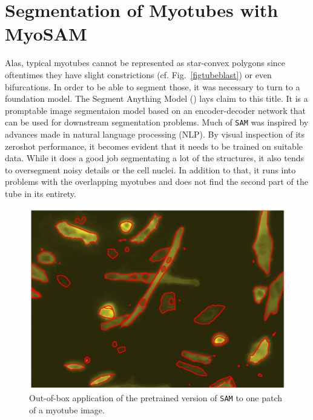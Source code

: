 \section{Segmentation of Myotubes with MyoSAM}
Alas, typical myotubes cannot be represented as star-convex polygons since oftentimes they have slight constrictions (cf. Fig.~\ref{figtubeblast}) or even bifurcations. In order to be able to segment those, it was necessary to turn to a foundation model. The Segment Anything Model \cite{kirillov2023segment} (\sam) lays claim to this title. It is a promptable image segmentaion model based on an encoder-decoder network that can be used for downstream segmentation problems. Much of \texttt{SAM} was inspired by advances made in natural language processing (NLP).
By visual inspection of its zeroshot performance, it becomes evident that it needs to be trained on suitable data. While it does a good job segmentating a lot of the structures, it also tends to oversegment noisy details or the cell nuclei. In addition to that, it runs into problems with the overlapping myotubes and does not find the second part of the tube in its entirety.
\begin{figure}
	\centering
	\includegraphics[width=\textwidth]{"images/sam_zeroshot.png"}
	\caption[\texttt{SAM} zeroshot]{Out-of-box application of the pretrained version of \texttt{SAM} to one patch of a myotube image.}
	\label{figzeroshot}
\end{figure}
